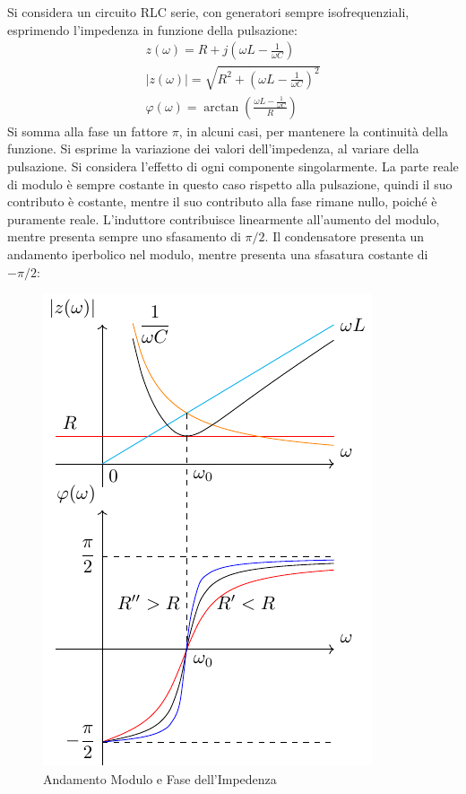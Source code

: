 \documentclass{article}
\numberwithin{equation}{subsection}
\begin{document}
Si considera un circuito RLC serie, con generatori sempre isofrequenziali, esprimendo l'impedenza in funzione della pulsazione:
\begin{gather}
    z(\omega)=R+j\displaystyle\left(\omega L-\frac{1}{\omega C}\right)\\
    |z(\omega)|=\displaystyle\sqrt{R^2+\left(\omega L-\frac{1}{\omega C}\right)^2}\\
    \varphi(\omega)=\arctan\left(\displaystyle\frac{\displaystyle\omega L-\frac{1}{\omega C}}{R}\right)
\end{gather}
Si somma alla fase un fattore $\pi$, in alcuni casi, per mantenere la continuità della funzione. Si esprime la variazione dei valori dell'impedenza, al variare della 
pulsazione. Si considera l'effetto di ogni componente singolarmente. La parte reale di modulo è sempre costante in questo caso rispetto alla pulsazione, quindi il suo 
contributo è costante, mentre il suo contributo alla fase rimane nullo, poiché è puramente reale. L'induttore contribuisce linearmente all'aumento del modulo, mentre presenta 
sempre uno sfasamento di $\pi/2$. Il condensatore presenta un andamento iperbolico nel modulo, mentre presenta una sfasatura costante di $-\pi/2$:
\begin{figure}[H]%
    \centering
    \includegraphics{andamento-impedenza-rlc-serie.pdf}%
    \caption{Andamento Modulo e Fase dell'Impedenza}%
    \label{fig:andamento-impedenza-rlc-serie}
\end{figure}
\end{document}
